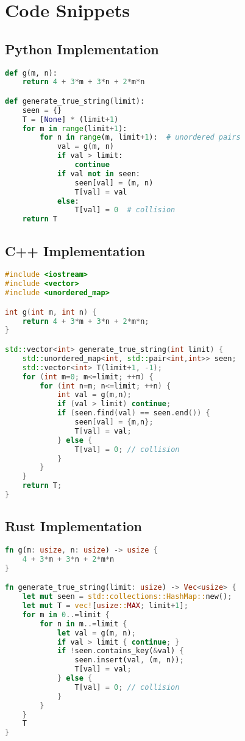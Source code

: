 \documentclass[12pt]{article}
\begin{document}
\section{Code Snippets}

\subsection{Python Implementation}

\begin{lstlisting}[language=Python]
def g(m, n):
    return 4 + 3*m + 3*n + 2*m*n

def generate_true_string(limit):
    seen = {}
    T = [None] * (limit+1)
    for m in range(limit+1):
        for n in range(m, limit+1):  # unordered pairs
            val = g(m, n)
            if val > limit:
                continue
            if val not in seen:
                seen[val] = (m, n)
                T[val] = val
            else:
                T[val] = 0  # collision
    return T
\end{lstlisting}

\subsection{C++ Implementation}

\begin{lstlisting}[language=C++]
#include <iostream>
#include <vector>
#include <unordered_map>

int g(int m, int n) {
    return 4 + 3*m + 3*n + 2*m*n;
}

std::vector<int> generate_true_string(int limit) {
    std::unordered_map<int, std::pair<int,int>> seen;
    std::vector<int> T(limit+1, -1);
    for (int m=0; m<=limit; ++m) {
        for (int n=m; n<=limit; ++n) {
            int val = g(m,n);
            if (val > limit) continue;
            if (seen.find(val) == seen.end()) {
                seen[val] = {m,n};
                T[val] = val;
            } else {
                T[val] = 0; // collision
            }
        }
    }
    return T;
}
\end{lstlisting}

\subsection{Rust Implementation}

\begin{lstlisting}[language=Rust]
fn g(m: usize, n: usize) -> usize {
    4 + 3*m + 3*n + 2*m*n
}

fn generate_true_string(limit: usize) -> Vec<usize> {
    let mut seen = std::collections::HashMap::new();
    let mut T = vec![usize::MAX; limit+1];
    for m in 0..=limit {
        for n in m..=limit {
            let val = g(m, n);
            if val > limit { continue; }
            if !seen.contains_key(&val) {
                seen.insert(val, (m, n));
                T[val] = val;
            } else {
                T[val] = 0; // collision
            }
        }
    }
    T
}
\end{lstlisting}
\end{document}
